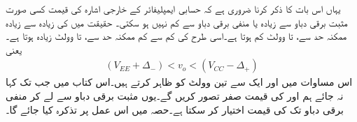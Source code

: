 یہاں اس بات کا ذکر کرنا ضروری ہے کہ حسابی ایمپلیفائر کے خارجی اشارہ کی قیمت کسی صورت مثبت برقی دباو  سے زیادہ یا منفی برقی دباو  سے کم نہیں ہو سکتی۔ حقیقت میں  کی زیادہ سے زیادہ ممکنہ حد سے، تا وولٹ کم ہوتا ہے۔اسی طرح کی کم سے کم ممکنہ حد    سے،   تا  وولٹ زیادہ ہوتا ہے۔یعنی
\begin{align}
\label{مساوات_حسابی_کے_خارجی_حدود}
(V_{EE} +\Delta_{-} )  <  v_o  < (V_{CC} -\Delta_{+})
\end{align}
اس مساوات میں  اور  ایک سے تین وولٹ کو ظاہر کرتے ہیں۔اس کتاب میں جب تک کہا نہ جائے ہم   اور   کی قیمت صفر تصور کریں گے۔یوں  مثبت برقی دباو  سے لے کر منفی برقی دباو تک کی قیمت اختیار کر سکتا ہے۔حصہ  میں اس عمل پر تذکرہ کیا جائے گا۔



